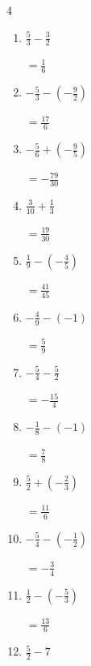 \begin{multicols}{4}
\begin{enumerate}
        $\displaystyle =9$

  \item $\displaystyle \frac{5}{3} - \frac{3}{2}$

        $\displaystyle =\frac{1}{6}$

  \item $\displaystyle -\frac{5}{3} - \left(-\frac{9}{2}\right)$

        $\displaystyle =\frac{17}{6}$

  \item $\displaystyle -\frac{5}{6} + \left(-\frac{9}{5}\right)$

        $\displaystyle =-\frac{79}{30}$

  \item $\displaystyle \frac{3}{10} + \frac{1}{3}$

        $\displaystyle =\frac{19}{30}$

  \item $\displaystyle \frac{1}{9} - \left(-\frac{4}{5}\right)$

        $\displaystyle =\frac{41}{45}$

  \item $\displaystyle -\frac{4}{9} - \left(-1\right)$

        $\displaystyle =\frac{5}{9}$

  \item $\displaystyle -\frac{5}{4} - \frac{5}{2}$

        $\displaystyle =-\frac{15}{4}$

  \item $\displaystyle -\frac{1}{8} - \left(-1\right)$

        $\displaystyle =\frac{7}{8}$

\columnbreak %

  \item $\displaystyle \frac{5}{2} + \left(-\frac{2}{3}\right)$

        $\displaystyle =\frac{11}{6}$

  \item $\displaystyle -\frac{5}{4} - \left(-\frac{1}{2}\right)$

        $\displaystyle =-\frac{3}{4}$

  \item $\displaystyle \frac{1}{2} - \left(-\frac{5}{3}\right)$

        $\displaystyle =\frac{13}{6}$

  \item $\displaystyle \frac{5}{2} - 7$


\end{enumerate}
\end{multicols}
